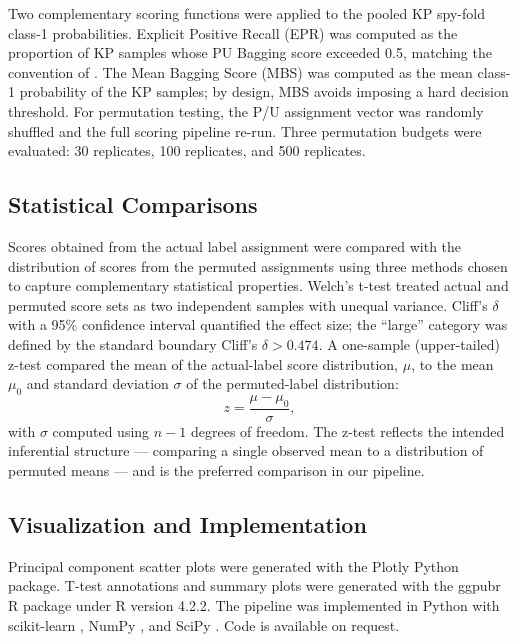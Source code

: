 \documentclass[11pt]{article}
\begin{document}
Two complementary scoring functions were applied to the pooled KP spy-fold class-1 probabilities. Explicit Positive Recall (EPR) was computed as the proportion of KP samples whose PU Bagging score exceeded 0.5, matching the convention of \cite{cheng2015epr}. The Mean Bagging Score (MBS) was computed as the mean class-1 probability of the KP samples; by design, MBS avoids imposing a hard decision threshold. For permutation testing, the P/U assignment vector was randomly shuffled and the full scoring pipeline re-run. Three permutation budgets were evaluated: 30 replicates, 100 replicates, and 500 replicates.

\subsection{Statistical Comparisons}

Scores obtained from the actual label assignment were compared with the distribution of scores from the permuted assignments using three methods chosen to capture complementary statistical properties. Welch's t-test treated actual and permuted score sets as two independent samples with unequal variance. Cliff's $\delta$ with a 95\% confidence interval \cite{cliff1993dominance} quantified the effect size; the ``large'' category was defined by the standard boundary Cliff's $\delta > 0.474$. A one-sample (upper-tailed) z-test compared the mean of the actual-label score distribution, $\mu$, to the mean $\mu_0$ and standard deviation $\sigma$ of the permuted-label distribution:
\begin{equation}
  z = \frac{\mu - \mu_0}{\sigma},
\end{equation}
with $\sigma$ computed using $n-1$ degrees of freedom. The z-test reflects the intended inferential structure --- comparing a single observed mean to a distribution of permuted means --- and is the preferred comparison in our pipeline.

\subsection{Visualization and Implementation}

Principal component scatter plots were generated with the Plotly Python package. T-test annotations and summary plots were generated with the ggpubr R package under R version 4.2.2. The pipeline was implemented in Python with scikit-learn \cite{pedregosa2011scikit,abraham2014scikit}, NumPy \cite{harris2020numpy}, and SciPy \cite{virtanen2020scipy}. Code is available on request.
\end{document}
